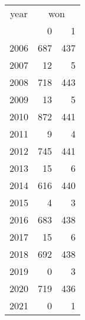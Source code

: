 \footnotesize\begin{tabular}[t]{lrr}
\toprule
\multicolumn{1}{c}{year} & \multicolumn{2}{c}{won} \\
\cmidrule(l{3pt}r{3pt}){1-1} \cmidrule(l{3pt}r{3pt}){2-3}
  & 0 & 1\\
\midrule
2006 & 687 & 437\\
2007 & 12 & 5\\
2008 & 718 & 443\\
2009 & 13 & 5\\
2010 & 872 & 441\\
2011 & 9 & 4\\
2012 & 745 & 441\\
2013 & 15 & 6\\
2014 & 616 & 440\\
2015 & 4 & 3\\
2016 & 683 & 438\\
2017 & 15 & 6\\
2018 & 692 & 438\\
2019 & 0 & 3\\
2020 & 719 & 436\\
2021 & 0 & 1\\
\bottomrule
\end{tabular}
